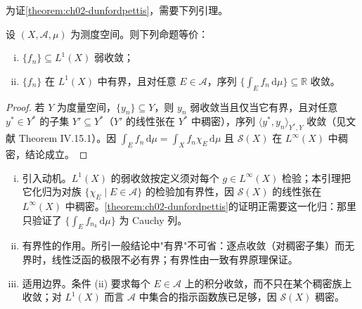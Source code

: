 \documentclass[../../main.tex]{subfiles}%
\begin{document}
为证\cref{theorem:ch02-dunfordpettis}，需要下列引理。

\begin{lemma}\label{lemma:ch02-弱收敛判据}
设 $(X,\mathscr A,\mu)$ 为测度空间。则下列命题等价：
\begin{enumerate}[(i)]
\item $\{f_n\}\subseteq L^1(X)$ 弱收敛；
\item $\{f_n\}$ 在 $L^1(X)$ 中有界，且对任意 $E\in\mathscr A$，序列 $\{\int_E f_n\,\mathrm{d}\mu\}\subseteq\mathbb R$ 收敛。
\end{enumerate}
\end{lemma}

\begin{proof}
若 $Y$ 为度量空间，$\{y_n\}\subseteq Y$，则 $y_n$ 弱收敛当且仅当它有界，且对任意 $y^*\in Y^*$ 的子集 $Y'\subseteq Y^*$（$Y'$ 的线性张在 $Y^*$ 中稠密），序列 $\langle y^*,y_n\rangle_{Y^*,Y}$ 收敛（见文献\cite{ref66} Theorem IV.15.1）。因 $\int_E f_n\,\mathrm{d}\mu=\int_X f_n\chi_E\,\mathrm{d}\mu$ 且 $\mathscr S(X)$ 在 $L^\infty(X)$ 中稠密，结论成立。
\end{proof}

\begin{remark}\label{remark:ch02-弱收敛判据}
\begin{enumerate}[(i)]
\item 引入动机。$L^1(X)$ 的弱收敛按定义须对每个 $g\in L^\infty(X)$ 检验；本引理把它化归为对族 $\{\chi_E\mid E\in\mathscr A\}$ 的检验加有界性，因 $\mathscr S(X)$ 的线性张在 $L^\infty(X)$ 中稠密。\cref{theorem:ch02-dunfordpettis}的证明正需要这一化归：那里只验证了 $\{\int_Ef_{n_k}\,\mathrm{d}\mu\}$ 为 Cauchy 列。
\item 有界性的作用。所引一般结论中"有界"不可省：逐点收敛（对稠密子集）而无界时，线性泛函的极限不必有界；有界性由一致有界原理保证。
\item 适用边界。条件 (ii) 要求每个 $E\in\mathscr A$ 上的积分收敛，而不只在某个稠密族上收敛；对 $L^1(X)$ 而言 $\mathscr A$ 中集合的指示函数族已足够，因 $\mathscr S(X)$ 稠密。
\end{enumerate}
\end{remark}
\end{document}
